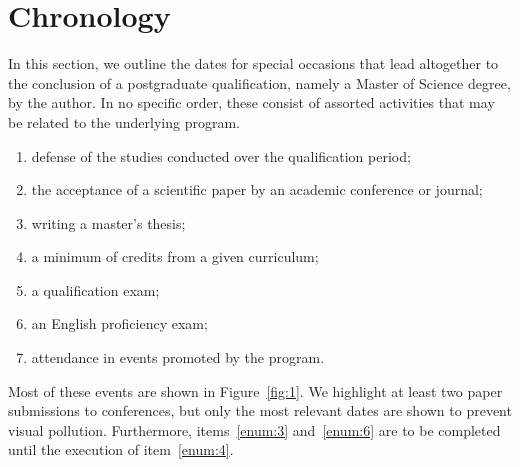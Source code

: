 \documentclass{article}
\title{}
\author{}
\date{}
\begin{document}
\section{Chronology}

In this section, we outline the dates for special occasions that lead altogether to the conclusion of a postgraduate qualification, namely a Master of Science degree, by the author. In no specific order, these consist of assorted activities that may be related to the underlying program.

\begin{enumerate}[label=(\roman*)]
    \item\label{enum:0} defense of the studies conducted over the qualification period;
    \item\label{enum:1} the acceptance of a scientific paper by an academic conference or journal;
    \item\label{enum:2} writing a master's thesis;
    \item\label{enum:3} a minimum of credits from a given curriculum;
    \item\label{enum:4} a qualification exam;
    \item\label{enum:5} an English proficiency exam;
    \item\label{enum:6} attendance in events promoted by the program. 
\end{enumerate}

Most of these events are shown in Figure~\ref{fig:1}. We highlight at least two paper submissions to conferences, but only the most relevant dates are shown to prevent visual pollution. Furthermore, items~\ref{enum:3} and~\ref{enum:6} are to be completed until the execution of item~\ref{enum:4}.
\end{document}
